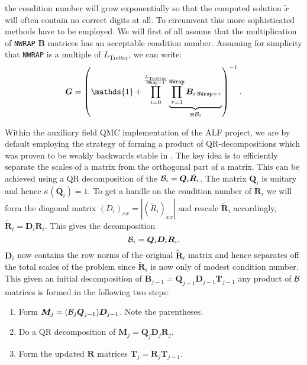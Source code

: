 the condition number  will grow exponentially so that the computed solution $\tilde{x}$
will often contain no correct digits at all.
To circumvent this more sophisticated methods have to be employed.   We will first of all assume that  the multiplication of  \texttt{NWRAP}  $\bm{B}$ matrices   has an acceptable condition number.   Assuming for simplicity that \texttt{NWRAP} is a multiple of  $L_{\text{Trotter}}$, we  can write: 
\begin{equation}
\bm{G} = \left( \mathds{1} + \prod\limits_{ i = 0}^{\frac{L_{\text{Trotter}}} {\texttt{NWrap} -1}}       \underbrace{\prod_{\tau=1}^{\texttt{NWrap}} \bm{B}_{i  \cdot  \texttt{NWrap}+ \tau} }_{ \equiv {\cal \bm{B}}_i}\right)^{-1}.
\end{equation}

Within the auxiliary field QMC implementation of the ALF project, we are by default employing
the strategy of forming a product of QR-decompositions which was proven to be weakly backwards stable in \cite{Bai2011}.
The key idea is to efficiently separate the scales of a matrix from the orthogonal part of a matrix.
This can be achieved using a QR decomposition of the ${\cal\bm{B}}_i = \bm{Q}_i \tilde{\bm{R}_i}$. The matrix $\bm{Q}_i$ is unitary and hence $\kappa(\bm{Q}_i) = 1$.
To get a handle on the condition number of $\tilde{\bm{R}}_i$ we will form the
diagonal matrix $(D_i)_{xx} = |(\tilde{R}_i)_{xx}|$ and rescale $\tilde{\bm{R}}_i$ accordingly, $\tilde{\bm{R}}_i = \bm{D}_i \bm{R}_i$.
This gives the decomposition
\begin{equation}
{\cal\bm{ B}}_i = \bm{Q}_i \bm{D}_i \bm{R}_i.
\end{equation}
$\bm{D}_i$ now contains the row norms of the original $\tilde{\bm{R}}_i$ matrix and hence separates off the total scales of the problem since $\tilde{\bm{R}}_i$ is now only of modest condition number.  
This given an initial decomposition of $\bm{B}_{j-1} = \bm{Q}_{j-1} \bm{D}_{j-1} \bm{T}_{j-1}$ any product 
of ${\cal\bm{ B}}$ matrices is formed in the following two steps:
\begin{enumerate}
\item Form $ \bm{M}_j = ({\cal \bm{B}}_j \bm{Q}_{j-1}) \bm{D}_{j-1}$. Note the parentheses.
\item Do a QR decomposition of $\bm{M}_j = \bm{Q}_j \bm{D}_j \bm{R}_j$.
\item Form the updated $\bm{R}$ matrices $\bm{T}_j = \bm{R}_j \bm{T}_{j-1}$.
\end{enumerate}
